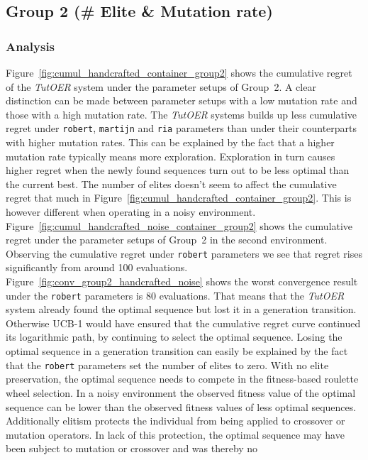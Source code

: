 \subsection{Group 2 (\# Elite \& Mutation rate)}
\label{sec:simulation_handcrafted_group2}
\subsubsection*{Analysis}
Figure~\ref{fig:cumul_handcrafted_container_group2} shows the cumulative regret
of the \emph{TutOER} system under the parameter setups of Group~2. A clear
distinction can be made between parameter setups with a low mutation rate and those
with a high mutation rate. The \emph{TutOER} systems builds up less cumulative
regret under \texttt{robert}, \texttt{martijn} and \texttt{ria} parameters than
under their counterparts with higher mutation rates. This can be explained by
the fact that a higher mutation rate typically means more exploration.
Exploration in turn causes higher regret when the newly found sequences turn out to be
less optimal than the current best. The number of elites doesn't seem to affect
the cumulative regret that much in
Figure~\ref{fig:cumul_handcrafted_container_group2}. This is however different
when operating in a noisy environment.
Figure~\ref{fig:cumul_handcrafted_noise_container_group2} shows the cumulative
regret under the parameter setups of Group~2 in the second environment. Observing
the cumulative regret under \texttt{robert} parameters we see that regret rises
significantly from around 100 evaluations.
Figure~\ref{fig:conv_group2_handcrafted_noise} shows the worst convergence result
under the \texttt{robert} parameters is 80 evaluations. That means that the
\emph{TutOER} system already found the optimal sequence but lost it in a
generation transition. Otherwise UCB-1 would have ensured that the
cumulative regret curve continued its logarithmic path, by continuing to select
the optimal sequence. Losing the optimal
sequence in a generation transition can easily be explained by the fact that
the \texttt{robert} parameters set the number of elites to zero. With no elite
preservation, the optimal sequence needs to compete in the fitness-based
roulette wheel selection. In a noisy environment the observed fitness value of
the optimal sequence can be lower than the observed fitness values of less optimal
sequences. Additionally elitism protects the individual from being applied to
crossover or mutation operators. In lack of this protection, the optimal
sequence may have been subject to mutation or crossover and was thereby no
